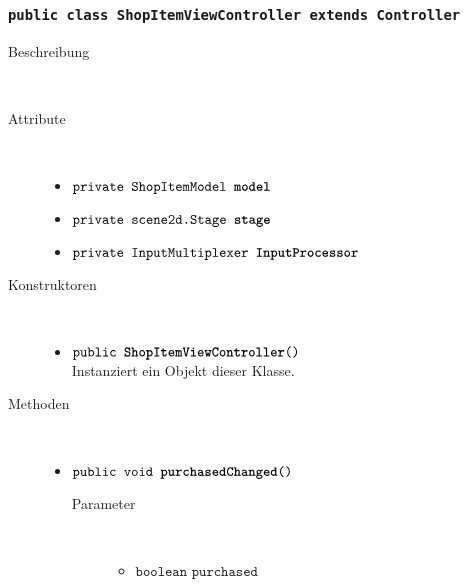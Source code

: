 	
\subsubsection{\normalfont \texttt{public class \textbf{ShopItemViewController} extends Controller}}

\begin{description}
\item[Beschreibung] \hfill \\ 
\item[Attribute] \hfill \\
	\vspace{-.8cm}
	\begin{itemize}	
		\item $\texttt{private ShopItemModel \textbf{model}}$ \\ 
		\item $\texttt{private scene2d.Stage \textbf{stage}}$ \\ 		
		\item $\texttt{private InputMultiplexer \textbf{InputProcessor}}$ \\ 
		\end{itemize}
	
\item[Konstruktoren] \hfill \\
	\vspace{-.8cm}
	\begin{itemize}
		\item $\texttt{public \textbf{ShopItemViewController}()}$ \\ Instanziert ein Objekt dieser Klasse.

	\end{itemize}
	
\item[Methoden] \hfill \\
	\vspace{-.8cm}
	\begin{itemize}
		\item $\texttt{public void \textbf{purchasedChanged}()}$ \\ 
			\begin{description}
			\item[Parameter] \hfill \\
			\vspace{-.8cm}
			\begin{itemize}
				\item $\texttt{boolean purchased}$ \\ 
			\end{itemize}
			\end{description}
		

\end{itemize}
\end{description}
